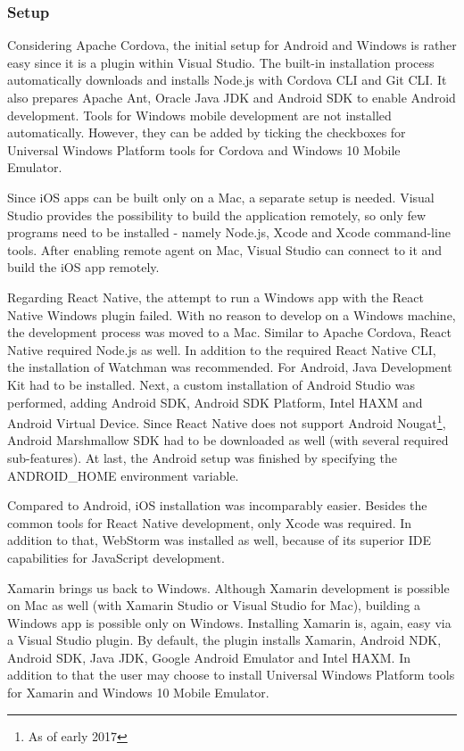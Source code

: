 \documentclass[english,master,public,dept460,male,cpdeclaration,oneside]{diploma}
\begin{document}
\subsubsection{Setup}
Considering Apache Cordova, the initial setup for Android and Windows is rather easy since it is a plugin within Visual Studio. The built-in installation process automatically downloads and installs Node.js with Cordova CLI and Git CLI. It also prepares Apache Ant, Oracle Java JDK and Android SDK to enable Android development. Tools for Windows mobile development are not installed automatically. However, they can be added by ticking the checkboxes for Universal Windows Platform tools for Cordova and Windows 10 Mobile Emulator. 

Since iOS apps can be built only on a Mac, a separate setup is needed. Visual Studio provides the possibility to build the application remotely, so only few programs need to be installed - namely Node.js, Xcode and Xcode command-line tools. After enabling remote agent on Mac, Visual Studio can connect to it and build the iOS app remotely.

Regarding React Native, the attempt to run a Windows app with the React Native Windows plugin failed. With no reason to develop on a Windows machine, the development process was moved to a Mac. Similar to Apache Cordova, React Native required Node.js as well. In addition to the required React Native CLI, the installation of Watchman was recommended. For Android, Java Development Kit had to be installed. Next, a custom installation of Android Studio was performed, adding Android SDK, Android SDK Platform, Intel HAXM and Android Virtual Device. Since React Native does not support Android Nougat\footnote{As of early 2017}, Android Marshmallow SDK had to be downloaded as well (with several required sub-features). At last, the Android setup was finished by specifying the ANDROID\_HOME environment variable.

Compared to Android, iOS installation was incomparably easier. Besides the common tools for React Native development, only Xcode was required. In addition to that, WebStorm was installed as well, because of its superior IDE capabilities for JavaScript development.

Xamarin brings us back to Windows. Although Xamarin development is possible on Mac as well (with Xamarin Studio or Visual Studio for Mac), building a Windows app is possible only on Windows. Installing Xamarin is, again, easy via a Visual Studio plugin. By default, the plugin installs Xamarin, Android NDK, Android SDK, Java JDK, Google Android Emulator and Intel HAXM. In addition to that the user may choose to install Universal Windows Platform tools for Xamarin and Windows 10 Mobile Emulator. 
\end{document}
